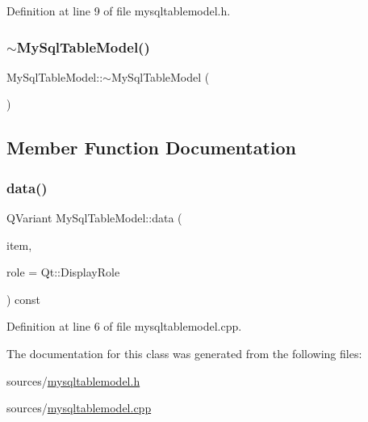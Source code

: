 Definition at line 9 of file mysqltablemodel.\+h.

\mbox{\label{class_my_sql_table_model_a625c9567e0060469977695e2c5996730}} 
\subsubsection{\texorpdfstring{$\sim$\+My\+Sql\+Table\+Model()}{~MySqlTableModel()}}
{\footnotesize\ttfamily My\+Sql\+Table\+Model\+::$\sim$\+My\+Sql\+Table\+Model (\begin{DoxyParamCaption}{ }\end{DoxyParamCaption})\hspace{0.3cm}{\ttfamily [default]}}



\subsection{Member Function Documentation}
\mbox{\label{class_my_sql_table_model_ac6a066535d9c183b28710f8e8fc616bd}} 
\subsubsection{\texorpdfstring{data()}{data()}}
{\footnotesize\ttfamily Q\+Variant My\+Sql\+Table\+Model\+::data (\begin{DoxyParamCaption}\item[{const Q\+Model\+Index \&}]{item,  }\item[{int}]{role = {\ttfamily Qt\+:\+:DisplayRole} }\end{DoxyParamCaption}) const\hspace{0.3cm}{\ttfamily [override]}}



Definition at line 6 of file mysqltablemodel.\+cpp.



The documentation for this class was generated from the following files\+:\begin{DoxyCompactItemize}
\item 
sources/\mbox{\hyperlink{mysqltablemodel_8h}{mysqltablemodel.\+h}}\item 
sources/\mbox{\hyperlink{mysqltablemodel_8cpp}{mysqltablemodel.\+cpp}}\end{DoxyCompactItemize}
